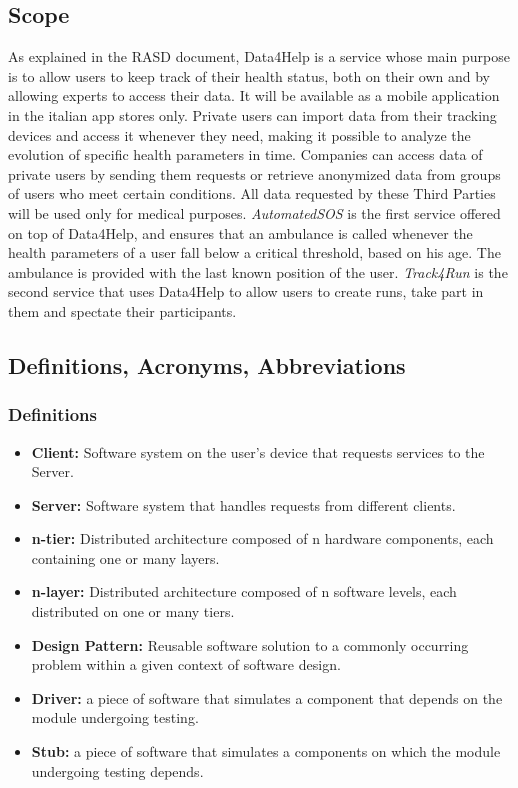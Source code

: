 \documentclass[titlepage]{article}
\begin{document}
\subsection{Scope}
As explained in the RASD document, Data4Help is a service whose main purpose is to allow users to keep track of their health status, both on their own and by allowing experts to access their data. It will be available as a mobile application in the italian app stores only.
Private users can import data from their tracking devices and access it whenever they need, making it possible to analyze the evolution of specific health parameters in time.
Companies can access data of private users by sending them requests or retrieve anonymized data from groups of users who meet certain conditions. All data requested by these Third Parties will be used only for medical purposes.\newline
\newline
\textit{AutomatedSOS} is the first service offered on top of Data4Help, and ensures that an ambulance is called whenever the health parameters of a user fall below a critical threshold, based on his age. The ambulance is provided with the last known position of the user.\newline
\newline
\textit{Track4Run} is the second service that uses Data4Help to allow users to create runs, take part in them and spectate their participants. 

\subsection{Definitions, Acronyms, Abbreviations}


	\subsubsection{Definitions}
	
	\begin{itemize}
				\item {\bf Client: }Software system on the user’s device that requests services to the Server.
				\item {\bf Server: }Software system that handles requests from different clients.
				\item {\bf n-tier: }Distributed architecture composed of n hardware components, each containing one or many layers.
				\item {\bf n-layer: }Distributed architecture composed of n software levels, each distributed on one or many tiers.
				\item {\bf Design Pattern: }Reusable software solution to a commonly occurring problem within a given context of software design.
				\item {\bf Driver: }a piece of software that simulates a component that depends on the module undergoing testing.
				\item {\bf Stub: }a piece of software that simulates a components on which the module undergoing testing depends.
	\end{itemize}
	
\end{document}
